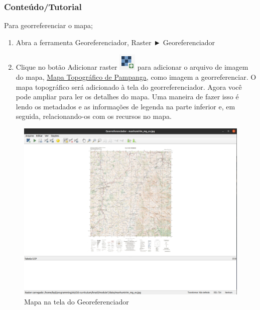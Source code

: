 \documentclass[
]{book}
\providecommand{\tightlist}{%
  \setlength{\itemsep}{0pt}\setlength{\parskip}{0pt}}
\begin{document}
\hypertarget{conteuxfadotutorial-6}{%
\subsubsection{\texorpdfstring{\textbf{Conteúdo/Tutorial}}{Conteúdo/Tutorial}}\label{conteuxfadotutorial-6}}

Para georreferenciar o mapa;

\begin{enumerate}
\def\labelenumi{\arabic{enumi}.}
\tightlist
\item
  Abra a ferramenta Georeferenciador, Raster ► Georeferenciador
\item
  Clique no botão Adicionar raster \includegraphics{media/modulo7/add-raster.png} para adicionar o arquivo de imagem do mapa, \href{media/modulo7/manhumirim_mg_es.jpeg}{Mapa Topográfico de Pampanga}, como imagem a georreferenciar. O mapa topográfico será adicionado à tela do georreferenciador. Agora você pode ampliar para ler os detalhes do mapa. Uma maneira de fazer isso é lendo os metadados e as informações de legenda na parte inferior e, em seguida, relacionando-os com os recursos no mapa.
\end{enumerate}

\begin{figure}
\centering
\includegraphics{media/modulo7/georeferencer.png}
\caption{Mapa na tela do Georeferenciador}
\end{figure}
\end{document}

